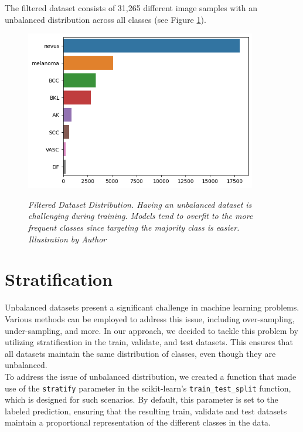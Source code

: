 The filtered dataset consists of 31,265 different image samples with an unbalanced distribution across all classes (see Figure \ref{fig:hole-dataset-distribution}).

\begin{figure}[H]
\centering
\includegraphics[width=0.9\textwidth]{imatges/methodological_contribution/hole-dataset-diagnosis.png}
\caption[Filtered Dataset Distribution]{\textit{Filtered Dataset Distribution. Having an unbalanced dataset is challenging during training. Models tend to overfit to the more frequent classes since targeting the majority class is easier. Illustration by Author}}
{\label{fig:hole-dataset-distribution}}
\end{figure}

\section{Stratification}

Unbalanced datasets present a significant challenge in machine learning problems. Various methods can be employed to address this issue, including over-sampling, under-sampling, and more. In our approach, we decided to tackle this problem by utilizing stratification in the train, validate, and test datasets. This ensures that all datasets maintain the same distribution of classes, even though they are unbalanced. \\

To address the issue of unbalanced distribution, we created a function that made use of the {\tt stratify} parameter in the scikit-learn's {\tt train\_test\_split} function, which is designed for such scenarios. By default, this parameter is set to the labeled prediction, ensuring that the resulting train, validate and test datasets maintain a proportional representation of the different classes in the data.

